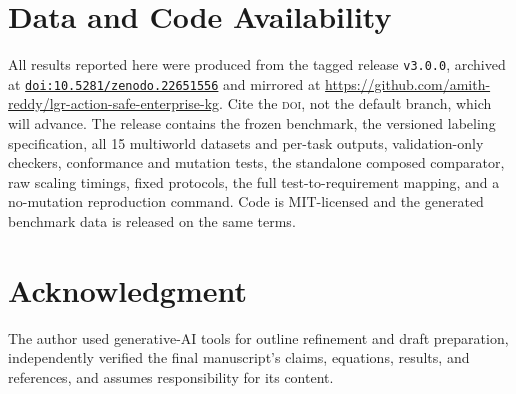 \documentclass[conference]{IEEEtran}
\begin{document}
\section*{Data and Code Availability}
All results reported here were produced from the tagged release \texttt{v3.0.0}, archived at \href{https://doi.org/10.5281/zenodo.22651556}{\texttt{doi:10.5281/zenodo.22651556}} and mirrored at \url{https://github.com/amith-reddy/lgr-action-safe-enterprise-kg}. Cite the \textsc{doi}, not the default branch, which will advance. The release contains the frozen benchmark, the versioned labeling specification, all 15 multiworld datasets and per-task outputs, validation-only checkers, conformance and mutation tests, the standalone composed comparator, raw scaling timings, fixed protocols, the full test-to-requirement mapping, and a no-mutation reproduction command. Code is MIT-licensed and the generated benchmark data is released on the same terms.

\section*{Acknowledgment}
The author used generative-AI tools for outline refinement and draft preparation, independently verified the final manuscript's claims, equations, results, and references, and assumes responsibility for its content.
\end{document}
